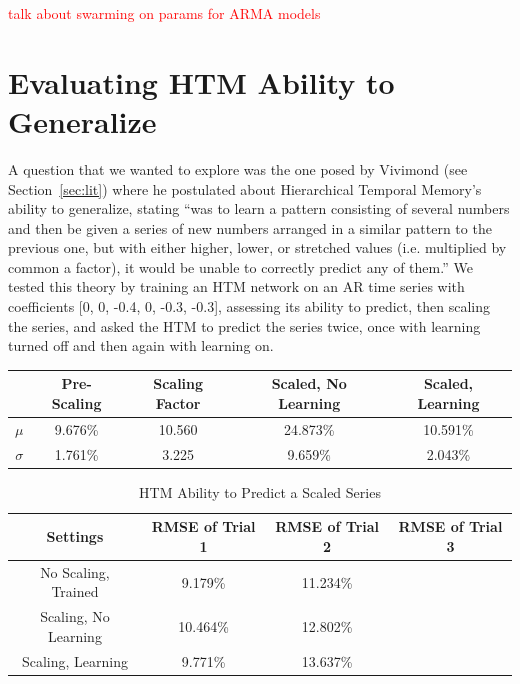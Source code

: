\documentclass[oneside,12pt,openany]{book}
\begin{document}
	\textcolor{red}{talk about swarming on params for ARMA models}

    \section{Evaluating HTM Ability to Generalize}
    
    A question that we wanted to explore was the one posed by Vivimond (see Section~\ref{sec:lit}) where he postulated about Hierarchical Temporal Memory's ability to generalize, stating ``was to learn a pattern consisting of several numbers and then be given a series of new numbers arranged in a similar pattern to the previous one, but with either higher, lower, or stretched values (i.e. multiplied by common a factor), it would be unable to correctly predict any of them.'' We tested this theory by training an HTM network on an AR time series with coefficients [0, 0, -0.4, 0, -0.3, -0.3], assessing its ability to predict, then scaling the series, and asked the HTM to predict the series twice, once with learning turned off and then again with learning on.
    
    \begin{table}[hbt!]
        \centering
        \begin{tabular}{|c|c|c|c|c|}
            \hline
            \textbf{} & \textbf{Pre-Scaling} & \textbf{Scaling Factor} & \textbf{Scaled, No Learning} & \textbf{Scaled, Learning} \\ \hline
            \textbf{$\mu$} & 9.676\% & 10.560 & 24.873\% & 10.591\% \\ \hline
            \textbf{$\sigma$} & 1.761\% & 3.225 & 9.659\% & 2.043\% \\ \hline
        \end{tabular}
    \end{table}
    
    
    \begin{table}[hbt!]
        \centering
        \begin{tabular}{|c|c|c|c|}
            \hline
            \textbf{Settings} & \textbf{RMSE of Trial 1} & \textbf{RMSE of Trial 2} & \textbf{RMSE of Trial 3} \\ \hline
            No Scaling, Trained & 9.179\% & 11.234\% &  \\ \hline
            Scaling, No Learning & 10.464\% & 12.802\% &  \\ \hline
            Scaling, Learning & 9.771\% & 13.637\% &  \\ \hline
        \end{tabular}\caption{HTM Ability to Predict a Scaled Series}
    \end{table}
\end{document}
